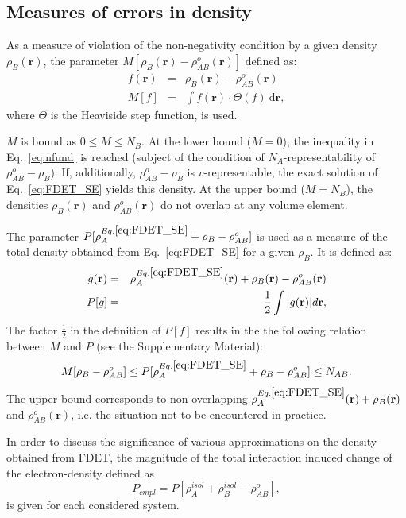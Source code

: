 \documentclass[amsmath,amssymb,preprint,aip,jcp]{revtex4-1}
\begin{document}
\subsection{Measures of errors in density}
As a measure of violation of the non-negativity condition by a given density $\rho_{B}(\mathbf{r})$, the
 parameter $M[\rho_{B}(\mathbf{r})-\rho^{o}_{AB}(\mathbf{r})]$ defined as:
\begin{eqnarray}\label{eq:M}
f(\mathbf{r})&=&\rho_{B}(\mathbf{r})-\rho^{o}_{AB}(\mathbf{r}) \nonumber\\
 M[f] & = & \int f(\mathbf{r})\cdot \Theta(f) \ \mathrm{d}\mathbf{r}, \label{eq:def_M}
\end{eqnarray}
where $\Theta$ is the Heaviside step function, is used.

$M$ is bound as $0 \le M\le N_{B}$. At the lower bound ($M=0$), the inequality in Eq.~\ref{eq:nfund} is reached (subject of the condition of $N_A$-representability of $\rho^{o}_{AB}-\rho_{B}$). If, additionally, $\rho^{o}_{AB}-\rho_{B}$ is $v$-representable, the exact solution of Eq.~\ref{eq:FDET_SE} yields this density. At the upper bound ($M=N_{B}$), the densities $\rho_{B}(\mathbf{r})$ and $\rho^{o}_{AB}(\mathbf{r})$ do not overlap at any volume element.

The parameter $P[\rho_A^{Eq.\ref{eq:FDET_SE}}+\rho_B-\rho_{AB}^{o}]$ is used as a measure of the total density obtained from Eq.~\ref{eq:FDET_SE}
for a given $\rho_{B}$. It is defined as: 
\begin{eqnarray}
g(\mathbf{r})&=&\rho^{Eq.\ref{eq:FDET_SE}}_A(\mathbf{r})+ \rho_B(\mathbf{r}) - \rho_{AB}^{o}(\mathbf{r}) \nonumber\\
 P[g] &=& \frac{1}{2} 
 \int \vert g(\mathbf{r}) \vert d\mathbf{r}, \label{eq:def_P}
\end{eqnarray}
The factor $\frac{1}{2}$ in the definition of $P[f]$ results in
the the following relation between $M$ and $P$ (see the Supplementary Material):
\begin{equation} \label{eq:P_bound}
 M[\rho_{B} - \rho^{o}_{AB}] \leq P[\rho^{Eq.\ref{eq:FDET_SE}}_A+\rho_B - \rho_{AB}^{o}] \leq %
 N_{AB}.
\end{equation}
The upper bound  corresponds to non-overlapping  $\rho^{Eq.\ref{eq:FDET_SE}}_A(\mathbf{r})+\rho_B(\mathbf{r})$ and $\rho_{AB}^{o}(\mathbf{r})$, i.e. the situation not to be encountered in practice.

In order to discuss the significance of various approximations on the density obtained from FDET, 
the magnitude of the total
interaction induced change of the electron-density defined as 
\begin{equation}\label{eq:p_cmpl}
 P_{cmpl} = P[\rho_A^{isol}+\rho_B^{isol} - \rho_{AB}^{o}],
\end{equation}
is given for each considered system. 
\end{document}
